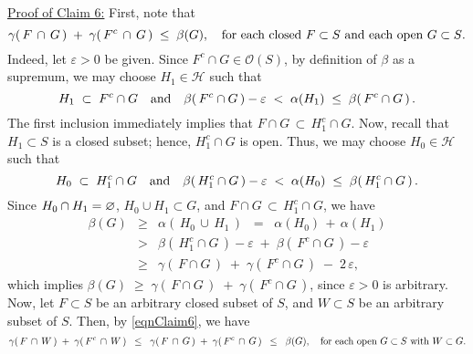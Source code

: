 \vskip 0.5cm
\noindent
\underline{Proof of Claim 6:}\quad
First, note that
\begin{equation}
\label{eqnClaim6}
\gamma(\,F\,\cap\,G\,) \;+\; \gamma(\,F^{c}\,\cap\,G\,) \;\leq\; \beta(G),
\quad
\textnormal{for each closed $F \subset S$ and each open $G \subset S$}.
\end{equation}
Indeed, let $\varepsilon > 0$ be given.
Since $F^{c}\cap G \in \mathcal{O}(S)$, by definition of $\beta$ as a supremum,
we may choose $H_{1} \in \mathcal{H}$ such that
\begin{equation*}
H_{1}\;\subset\;F^{c}\cap G
\quad\textnormal{and}\quad
\beta\!\left(\,F^{c}\cap G\,\right) - \varepsilon \;<\; \alpha(H_{1}) \;\leq\; \beta\!\left(\,F^{c}\cap G\,\right).
\end{equation*}
The first inclusion immediately implies that $F\cap G \,\subset\, H_{1}^{c}\cap G$.
Now, recall that $H_{1} \subset S$ is a closed subset; hence, $H_{1}^{c}\cap G$ is open.
Thus, we may choose $H_{0} \in \mathcal{H}$ such that
\begin{equation*}
H_{0}\;\subset\;H_{1}^{c}\cap G
\quad\textnormal{and}\quad
\beta\!\left(\,H_{1}^{c}\cap G\,\right) - \varepsilon \;<\; \alpha(H_{0}) \;\leq\; \beta\!\left(\,H_{1}^{c}\cap G\,\right).
\end{equation*}
Since $H_{0}\cap H_{1} = \varnothing$, $H_{0} \cup H_{1} \subset G$, and
$F\cap G \,\subset\, H_{1}^{c}\cap G$, we have
\begin{eqnarray*}
\beta(G)
&\geq& \alpha\!\left(\,H_{0}\,\cup\,H_{1}\,\right)
\;\;=\;\; \alpha(H_{0})\,+\,\alpha(H_{1})
\\
& > & \beta\!\left(\,H_{1}^{c}\cap G\,\right) - \varepsilon \;+\; \beta\!\left(\,F^{c}\cap G\,\right) - \varepsilon
\\
&\geq& \gamma\!\left(\,F\cap G\,\right) \;+\; \gamma\!\left(\,F^{c}\cap G\,\right) \;-\; 2\,\varepsilon,
\end{eqnarray*}
which implies $\beta(G) \;\geq\; \gamma\!\left(\,F\cap G\,\right) \;+\; \gamma\!\left(\,F^{c}\cap G\,\right)$,
since $\varepsilon > 0$ is arbitrary.
\vskip 0.3cm
\noindent
Now, let $F \subset S$ be an arbitrary closed subset of $S$, and $W \subset S$ be an arbitrary subset of $S$.
Then, by \eqref{eqnClaim6}, we have
\begin{equation*}
\gamma(\,F\,\cap\,W\,) \;+\; \gamma(\,F^{c}\,\cap\,W\,)
\;\;\leq\;\; \gamma(\,F\,\cap\,G\,) \;+\; \gamma(\,F^{c}\,\cap\,G\,)
\;\;\leq\;\; \beta(G),
\quad
\textnormal{for each open $G \subset S$ with $W \subset G$}.
\end{equation*}
